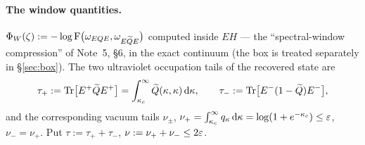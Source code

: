 \documentclass[11pt]{article}
\begin{document}
\paragraph{The window quantities.}  $\Phi_W(\zeta):=-\log\operatorname{F}\bigl(\omega_{EQE},\omega_{E\widetilde QE}\bigr)$
computed inside $EH$ --- the ``spectral-window compression'' of Note~5, \S6, in the exact continuum
(the box is treated separately in \S\ref{sec:box}).  The two ultraviolet occupation tails of the
recovered state are
\begin{equation}\label{eq:taudef}
 \tau_+:=\operatorname{Tr}\bigl[E^+\widetilde QE^+\bigr]=\int_{\kappa_c}^{\infty}\widetilde Q(\kappa,\kappa)\,\mathrm d\kappa,
 \qquad
 \tau_-:=\operatorname{Tr}\bigl[E^-(1-\widetilde Q)E^-\bigr],
\end{equation}
and the corresponding vacuum tails $\nu_\pm$, $\nu_+=\int_{\kappa_c}^\infty q_\kappa\,\mathrm d\kappa
=\log(1+e^{-\kappa_c})\le\varepsilon$, $\nu_-=\nu_+$.  Put $\tau:=\tau_++\tau_-$, $\nu:=\nu_++\nu_-\le2\varepsilon$.
\end{document}
